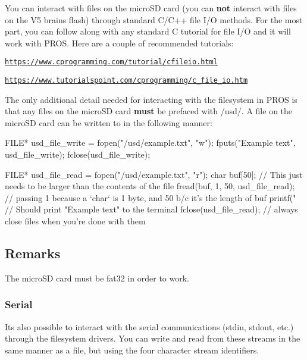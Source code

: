 You can interact with files on the micro\+SD card (you can {\bfseries not} interact with files on the V5 brain\textquotesingle{}s flash) through standard C/\+C++ file I/O methods. For the most part, you can follow along with any standard C tutorial for file I/O and it will work with P\+R\+OS. Here are a couple of recommended tutorials\+:


\begin{DoxyItemize}
\item \href{https://www.cprogramming.com/tutorial/cfileio.html}{\tt https\+://www.\+cprogramming.\+com/tutorial/cfileio.\+html}
\item \href{https://www.tutorialspoint.com/cprogramming/c_file_io.htm}{\tt https\+://www.\+tutorialspoint.\+com/cprogramming/c\+\_\+file\+\_\+io.\+htm}
\end{DoxyItemize}

The only additional detail needed for interacting with the filesystem in P\+R\+OS is that any files on the micro\+SD card {\bfseries must} be prefaced with {\ttfamily /usd/}. A file on the micro\+SD card can be written to in the following manner\+:


\begin{DoxyCode}
FILE* usd\_file\_write = fopen("/usd/example.txt", "w");
fputs("Example text", usd\_file\_write);
fclose(usd\_file\_write);

FILE* usd\_file\_read = fopen("/usd/example.txt", "r");
char buf[50]; // This just needs to be larger than the contents of the file
fread(buf, 1, 50, usd\_file\_read); // passing 1 because a `char` is 1 byte, and 50 b/c it's the length of
       buf
printf("%
// Should print "Example text" to the terminal
fclose(usd\_file\_read); // always close files when you're done with them
\end{DoxyCode}


\subsection*{Remarks}

The micro\+SD card must be fat32 in order to work.

\subsubsection*{Serial}

It\textquotesingle{}s also possible to interact with the serial communications ({\ttfamily stdin}, {\ttfamily stdout}, etc.) through the filesystem drivers. You can write and read from these streams in the same manner as a file, but using the four character stream identifiers.

